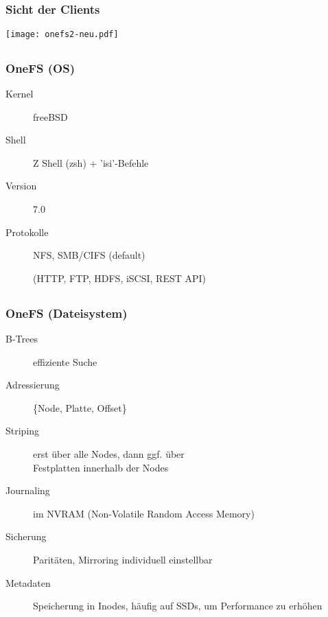 \documentclass{beamer}
\begin{document}
\subsection{}
\begin{frame}[fragile]
  \frametitle{Sicht der Clients}

  \begin{center}\texttt{[image: onefs2-neu.pdf]}\end{center}

\end{frame}  

\subsection{}
\begin{frame}[fragile]
  \frametitle{OneFS (OS)}

  \begin{description}
    \item[Kernel] freeBSD
    \item[Shell] Z Shell (zsh) + 'isi'-Befehle
    \item[Version] 7.0
    \item[Protokolle] NFS, SMB/CIFS (default)
    \item[] (HTTP, FTP, HDFS, iSCSI, REST API) 

   \end{description}

\end{frame}    

\subsection{}
\begin{frame}[fragile]
  \frametitle{OneFS (Dateisystem)}

  \begin{description}
    \item[B-Trees] effiziente Suche
    \item[Adressierung] \{Node, Platte, Offset\}
    \item[Striping] erst über alle Nodes, dann ggf. über \\Festplatten innerhalb der Nodes
    \item[Journaling] im NVRAM (Non-Volatile Random Access Memory)
    \item[Sicherung] Paritäten, Mirroring individuell einstellbar
    \item[Metadaten] Speicherung in Inodes, häufig auf SSDs, um Performance zu erhöhen
  \end{description}

\end{frame}
\end{document}
